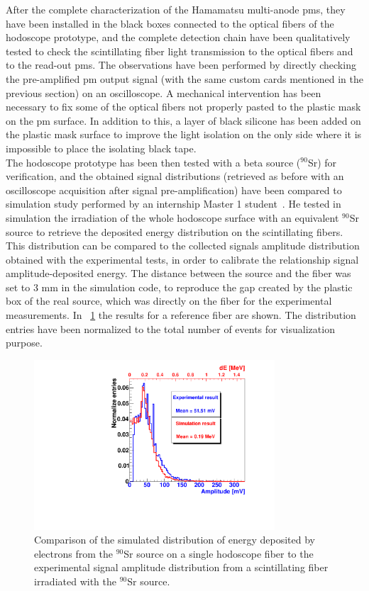 After the complete characterization of the Hamamatsu multi-anode \glspl{pm}, they have been installed in the black boxes connected to the optical fibers of the hodoscope prototype, and the complete detection chain have been qualitatively tested to check the scintillating fiber light transmission to the optical fibers and to the read-out \glspl{pm}. The observations have been performed by directly checking the pre-amplified \gls{pm} output signal (with the same custom cards mentioned in the previous section) on an oscilloscope. A mechanical intervention has been necessary to fix some of the optical fibers not properly pasted to the plastic mask on the \gls{pm} surface. In addition to this, a layer of black silicone has been added on the plastic mask surface to improve the light isolation on the only side where it is impossible to place the isolating black tape.\\
The hodoscope prototype has been then tested with a beta source ($^{90}$Sr) for verification, and the obtained signal distributions (retrieved as before with an oscilloscope acquisition after signal pre-amplification) have been compared to simulation study performed by an internship Master 1 student~\parencite{Vallois2016}. He tested in simulation the irradiation of the whole hodoscope surface with an equivalent $^{90}$Sr source to retrieve the deposited energy distribution on the scintillating fibers. This distribution can be compared to the collected signals amplitude distribution obtained with the experimental tests, in order to calibrate the relationship signal amplitude-deposited energy. The distance between the source and the fiber was set to 3 mm in the simulation code, to reproduce the gap created by the plastic box of the real source, which was directly  on the fiber for the experimental measurements. In \figurename~\ref{chap3::fig::hodoSimuData} the results for a reference fiber are shown. The distribution entries have been normalized to the total number of events for visualization purpose.

\begin{figure}[htb]
\centering
\includegraphics[width=0.8\textwidth]{03_GraphicFiles/chapter3_CLaRySproto/Hodoscope/dEdistrComparison.pdf}
\caption{Comparison of the simulated distribution of energy deposited by electrons from the $^{90}$Sr source on a single hodoscope fiber to the experimental signal amplitude distribution from a scintillating fiber irradiated with the $^{90}$Sr source.}
\label{chap3::fig::hodoSimuData}
\end{figure}

